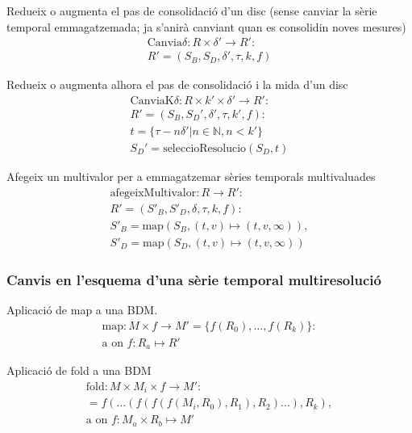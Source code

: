 Redueix o augmenta el pas de consolidació d'un disc (sense canviar la sèrie temporal emmagatzemada; ja s'anirà canviant quan es consolidin noves mesures)
  \begin{gather*}
    \text{Canvia}\delta: R \times \delta' \longrightarrow R': \\
    R' = (S_B,S_D,\delta',\tau,k,f)
  \end{gather*}


Redueix o augmenta alhora el pas de consolidació i la mida d'un disc
  \begin{gather*}
    \text{CanviaK}\delta: R \times k' \times \delta' \longrightarrow R': \\
    R' = (S_B,S_D',\delta',\tau,k',f): \\    
    t = \{ \tau-n\delta' | n\in\mathbb{N},n<k' \} \\
    S_D' = \text{seleccioResolucio}(S_D,t)
  \end{gather*}




Afegeix un multivalor per a emmagatzemar sèries temporals multivaluades
  \begin{gather*}
    \text{afegeixMultivalor}: R \longrightarrow R': \\
    R' = (S'_{B},S'_{D},\delta,\tau,k,f): \\
    S'_{B} = \text{map}(S_B,(t,v)\mapsto(t,v,\infty)), \\
    S'_{D} = \text{map}(S_D,(t,v)\mapsto(t,v,\infty))
  \end{gather*}




\subsubsection{Canvis en l'esquema d'una sèrie temporal multiresolució}

Aplicació de map a una BDM.
\begin{gather*}
  \text{map}: M \times f \longrightarrow M' = \{ f(R_0), \dotsc, f(R_k) \} :\\
   \text{a on } f: R_a \mapsto R'
 \end{gather*}
 
Aplicació de fold a una BDM
\begin{gather*}
  \text{fold}: M \times M_i \times f \longrightarrow M' :\\
  = f(\dots(f(f(f(M_i,R_0),R_1),R_2)\dots),R_k), \\
   \text{a on } f: M_a \times R_b \mapsto M'
\end{gather*}





